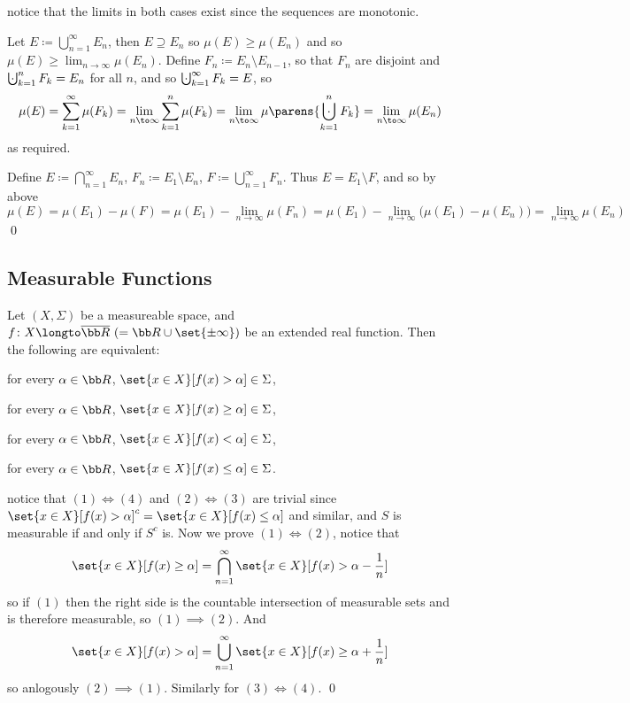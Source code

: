 \Proof notice that the limits in both cases exist since the sequences are monotonic.
\benum
    \item Let $E\coloneqq\bigcup_{n=1}^\infty E_n$, then $E\supseteq E_n$ so $\mu(E)\geq\mu(E_n)$ and so $\mu(E)\geq\lim_{n\to\infty}\mu(E_n)$.
        Define $F_n\coloneqq E_n\setminus E_{n-1}$, so that $F_n$ are disjoint and $\bigdcup_{k=1}^nF_k=E_n$ for all $n$, and so $\bigdcup_{k=1}^\infty F_k=E$, so
        $$ \mu(E) = \sum_{k=1}^\infty \mu(F_k) = \lim_{n\to\infty}\sum_{k=1}^n\mu(F_k) = \lim_{n\to\infty}\mu\parens{\bigdcup_{k=1}^nF_k}=\lim_{n\to\infty}\mu(E_n) $$
        as required.
    \item Define $E\coloneqq\bigcap_{n=1}^\infty E_n$, $F_n\coloneqq E_1\setminus E_n$, $F\coloneqq\bigcup_{n=1}^\infty F_n$.
        Thus $E=E_1\setminus F$, and so by above
        $$ \mu(E) = \mu(E_1) - \mu(F) = \mu(E_1) - \lim_{n\to\infty}\mu(F_n) = \mu(E_1) - \lim_{n\to\infty}\bigl(\mu(E_1)-\mu(E_n)\bigr) = \lim_{n\to\infty}\mu(E_n) $$
        \qed
\eenum

\subsection{Measurable Functions}

\bthrm

    Let $(X,\Sigma)$ be a measureable space, and $f\colon X\longto\overline{\bb R}\ (={\bb R}\cup\set{\pm\infty})$ be an extended real function.
    Then the following are equivalent:
    \benum
        \item for every $\alpha\in{\bb R}$, $\set{x\in X}[f(x)>\alpha]\in\Sigma$,
        \item for every $\alpha\in{\bb R}$, $\set{x\in X}[f(x)\geq\alpha]\in\Sigma$,
        \item for every $\alpha\in{\bb R}$, $\set{x\in X}[f(x)<\alpha]\in\Sigma$,
        \item for every $\alpha\in{\bb R}$, $\set{x\in X}[f(x)\leq\alpha]\in\Sigma$.
    \eenum

\ethrm

\Proof notice that $(1)\iff(4)$ and $(2)\iff(3)$ are trivial since $\set{x\in X}[f(x)>\alpha]^c=\set{x\in X}[f(x)\leq\alpha]$ and similar, and $S$ is measurable if and only if $S^c$ is.
Now we prove $(1)\iff(2)$, notice that
$$ \set{x\in X}[f(x)\geq\alpha] = \bigcap_{n=1}^\infty\set{x\in X}[f(x)>\alpha-\frac1n] $$
so if $(1)$ then the right side is the countable intersection of measurable sets and is therefore measurable, so $(1)\implies(2)$.
And
$$ \set{x\in X}[f(x)>\alpha] = \bigcup_{n=1}^\infty\set{x\in X}[f(x)\geq\alpha+\frac1n] $$
so anlogously $(2)\implies(1)$.
Similarly for $(3)\iff(4)$.
\qed

